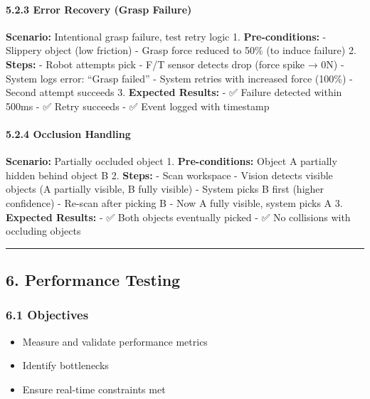 \documentclass[
]{article}
\providecommand{\tightlist}{%
  \setlength{\itemsep}{0pt}\setlength{\parskip}{0pt}}
\begin{document}
\hypertarget{error-recovery-grasp-failure}{%
\paragraph{5.2.3 Error Recovery (Grasp
Failure)}\label{error-recovery-grasp-failure}}

\textbf{Scenario:} Intentional grasp failure, test retry logic 1.
\textbf{Pre-conditions:} - Slippery object (low friction) - Grasp force
reduced to 50\% (to induce failure) 2. \textbf{Steps:} - Robot attempts
pick - F/T sensor detects drop (force spike → 0N) - System logs error:
``Grasp failed'' - System retries with increased force (100\%) - Second
attempt succeeds 3. \textbf{Expected Results:} - ✅ Failure detected
within 500ms - ✅ Retry succeeds - ✅ Event logged with timestamp

\hypertarget{occlusion-handling}{%
\paragraph{5.2.4 Occlusion Handling}\label{occlusion-handling}}

\textbf{Scenario:} Partially occluded object 1. \textbf{Pre-conditions:}
Object A partially hidden behind object B 2. \textbf{Steps:} - Scan
workspace - Vision detects visible objects (A partially visible, B fully
visible) - System picks B first (higher confidence) - Re-scan after
picking B - Now A fully visible, system picks A 3. \textbf{Expected
Results:} - ✅ Both objects eventually picked - ✅ No collisions with
occluding objects

\begin{center}\rule{0.5\linewidth}{0.5pt}\end{center}

\hypertarget{performance-testing}{%
\subsection{6. Performance Testing}\label{performance-testing}}

\hypertarget{objectives-3}{%
\subsubsection{6.1 Objectives}\label{objectives-3}}

\begin{itemize}
\tightlist
\item
  Measure and validate performance metrics
\item
  Identify bottlenecks
\item
  Ensure real-time constraints met
\end{itemize}
\end{document}
